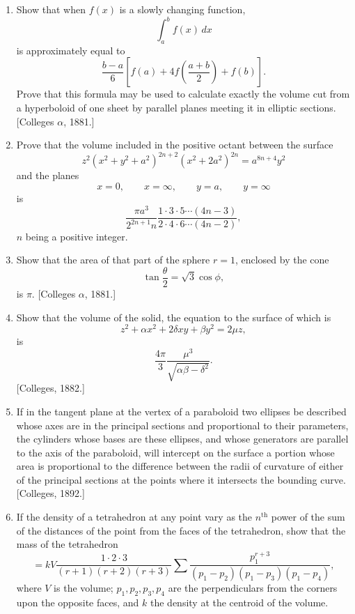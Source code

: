 \documentclass[11pt, a4paper]{article}
\newcommand{\source}[1]{\hfill\textnormal{[#1]}}
\begin{document}
\begin{enumerate}[leftmargin=2em]

\item[23.] Show that when $f(x)$ is a slowly changing function,
\[
\int_a^b f(x)\,dx
\]
is approximately equal to
\[
\frac{b-a}{6}
\left[
f(a)+4f\left(\frac{a+b}{2}\right)+f(b)
\right].
\]
Prove that this formula may be used to calculate exactly the volume cut from a hyperboloid of one sheet by parallel planes meeting it in elliptic sections.
\source{Colleges $\alpha$, 1881.}

\item[24.] Prove that the volume included in the positive octant between the surface
\[
z^2(x^2+y^2+a^2)^{2n+2}(x^2+2a^2)^{2n}=a^{8n+4}y^2
\]
and the planes
\[
x=0,\qquad x=\infty,\qquad y=a,\qquad y=\infty
\]
is
\[
\frac{\pi a^3}{2^{2n+1}n}
\frac{1\cdot3\cdot5\cdots(4n-3)}
{2\cdot4\cdot6\cdots(4n-2)},
\]
$n$ being a positive integer.

\item[25.] Show that the area of that part of the sphere $r=1$, enclosed by the cone
\[
\tan\frac{\theta}{2}=\sqrt3\cos\phi,
\]
is $\pi$.
\source{Colleges $\alpha$, 1881.}

\item[26.] Show that the volume of the solid, the equation to the surface of which is
\[
z^2+\alpha x^2+2\delta xy+\beta y^2=2\mu z,
\]
is
\[
\frac{4\pi}{3}\frac{\mu^3}{\sqrt{\alpha\beta-\delta^2}}.
\]
\source{Colleges, 1882.}

\item[27.] If in the tangent plane at the vertex of a paraboloid two ellipses be described whose axes are in the principal sections and proportional to their parameters, the cylinders whose bases are these ellipses, and whose generators are parallel to the axis of the paraboloid, will intercept on the surface a portion whose area is proportional to the difference between the radii of curvature of either of the principal sections at the points where it intersects the bounding curve.
\source{Colleges, 1892.}

\item[28.] If the density of a tetrahedron at any point vary as the $n^{\text{th}}$ power of the sum of the distances of the point from the faces of the tetrahedron, show that the mass of the tetrahedron
\[
=kV\frac{1\cdot2\cdot3}{(r+1)(r+2)(r+3)}
\sum\frac{p_1^{r+3}}
{(p_1-p_2)(p_1-p_3)(p_1-p_4)},
\]
where $V$ is the volume; $p_1,p_2,p_3,p_4$ are the perpendiculars from the corners upon the opposite faces, and $k$ the density at the centroid of the volume.


\end{enumerate}
\end{document}
